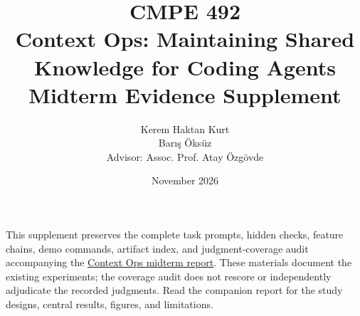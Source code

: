 \documentclass[a4paper,12pt]{report}
\title{CMPE 492\\[0.8em]Context Ops: Maintaining Shared Knowledge for Coding Agents\\[0.5em]\large Midterm Evidence Supplement}
\author{Kerem Haktan Kurt\\Bar\i{}\c{s} \"{O}ks\"{u}z\\[1.2em]Advisor: Assoc. Prof. Atay \"{O}zg\"{o}vde}
\date{November 2026}
\begin{document}
\hypersetup{pageanchor=false}
\maketitle{}
\hypersetup{pageanchor=true}
\tableofcontents
\clearpage
\noindent This supplement preserves the complete task prompts, hidden checks, feature chains, demo commands, artifact index, and judgment-coverage audit accompanying the \href{context-ops-midterm.pdf}{Context Ops midterm report}. These materials document the existing experiments; the coverage audit does not rescore or independently adjudicate the recorded judgments. Read the companion report for the study designs, central results, figures, and limitations.
\clearpage
{}
\appendix

\end{document}
